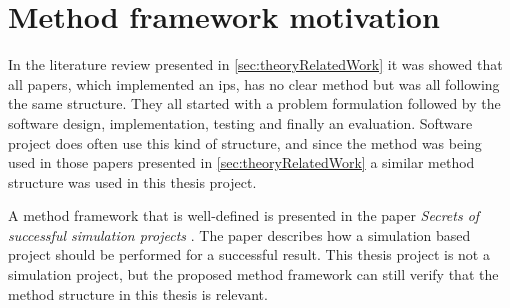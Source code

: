 \section{Method framework motivation}\label{sec:methodFramework}

In the literature review presented in \cref{sec:theoryRelatedWork} it was showed that  all papers, which implemented an \acrfull{ips}, has no clear method but was all following the same structure.
They all started with a problem formulation followed by the software design, implementation, testing and finally an evaluation.
Software project does often use this kind of structure, and since the method was being used in those papers presented in \cref{sec:theoryRelatedWork} a similar method structure was used in this thesis project.

\bigskip

A method framework that is well-defined is presented in the paper \textit{Secrets of successful simulation projects} \cite{SecretsSuccessfulSimulation1995}.
The paper describes how a simulation based project should be performed for a successful result.
This thesis project is not a simulation project, but the proposed method framework can still verify that the method structure in this thesis is relevant.
